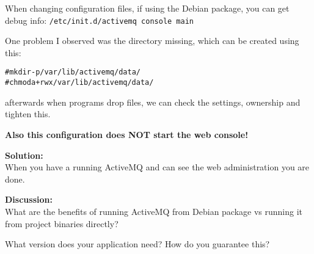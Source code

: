 \documentclass[a4paper,11pt,notitlepage]{report}
\begin{document}
When changing configuration files, if using the Debian package, you can get debug info:
\verb+/etc/init.d/activemq console main+

One problem I observed was the directory missing, which can be created using this:
\begin{alltt}
# mkdir -p  /var/lib/activemq/data/
# chmod a+rwx  /var/lib/activemq/data/
\end{alltt}

afterwards when programs drop files, we can check the settings, ownership and tighten this.

{\bf Also this configuration does NOT start the web console!}

{\bf Solution:}\\
When you have a running ActiveMQ and can see the web administration you are done.

{\bf Discussion:}\\
What are the benefits of running ActiveMQ from Debian package vs running it from project binaries directly?

What version does your application need? How do you guarantee this?
\end{document}
